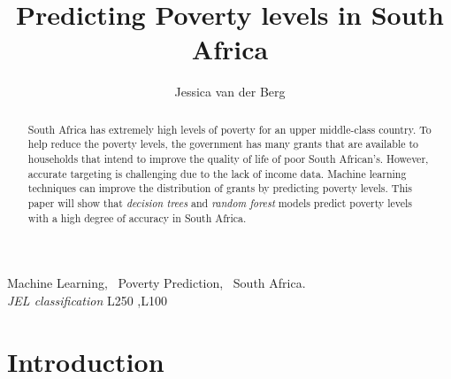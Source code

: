 \documentclass[11pt,preprint, authoryear]{elsarticle}
\numberwithin{equation}{section}
\numberwithin{figure}{section}
\numberwithin{table}{section}
\begin{document}
\begin{frontmatter}  %

\title{Predicting Poverty levels in South Africa}





\author[Add1]{Jessica van der Berg}





\address[Add1]{Stellenbosch University, South Africa}


\begin{abstract}
\small{
South Africa has extremely high levels of poverty for an upper
middle-class country. To help reduce the poverty levels, the government
has many grants that are available to households that intend to improve
the quality of life of poor South African's. However, accurate targeting
is challenging due to the lack of income data. Machine learning
techniques can improve the distribution of grants by predicting poverty
levels. This paper will show that \emph{decision trees} and
\emph{random forest} models predict poverty levels with a high degree of
accuracy in South Africa.
}
\end{abstract}

\vspace{1cm}

\begin{keyword}
\footnotesize{
Machine Learning, ~Poverty Prediction, ~South Africa. \\ \vspace{0.3cm}
\textit{JEL classification} L250 \sep L100
}
\end{keyword}
\vspace{0.5cm}
\end{frontmatter}



\pagestyle{fancy}
\chead{}
\rhead{}
\lfoot{}
\lhead{}
\cfoot{}


\headsep 35pt %




\hypertarget{introduction}{%
\section{\texorpdfstring{Introduction
\label{Introduction}}{Introduction }}\label{introduction}}
\end{document}
